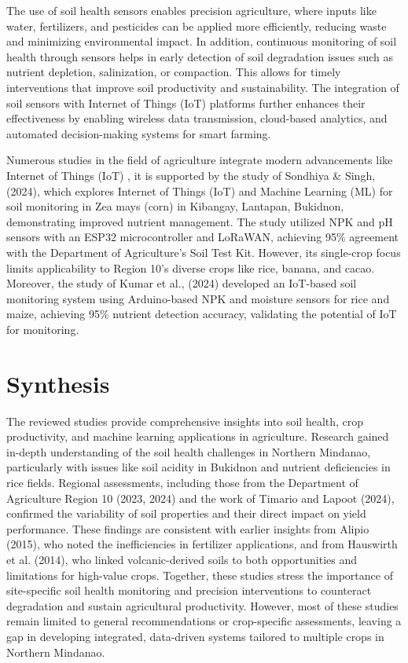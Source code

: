 {The use of soil health sensors enables precision agriculture, where inputs like water, fertilizers, and pesticides can be applied more efficiently, reducing waste and minimizing environmental impact. In addition, continuous monitoring of soil health through sensors helps in early detection of soil degradation issues such as nutrient depletion, salinization, or compaction. This allows for timely interventions that improve soil productivity and sustainability. The integration of soil sensors with Internet of Things (IoT) platforms further enhances their effectiveness by enabling wireless data transmission, cloud-based analytics, and automated decision-making systems for smart farming.

Numerous studies in the field of agriculture integrate modern advancements like Internet of Things (IoT) , it is supported by the study of Sondhiya \& Singh, (2024), which explores  Internet of Things (IoT) and Machine Learning (ML) for soil monitoring in Zea mays (corn) in Kibangay, Lantapan, Bukidnon, demonstrating improved nutrient management. The study utilized NPK and pH sensors with an ESP32 microcontroller and LoRaWAN, achieving 95\% agreement with the Department of Agriculture’s Soil Test Kit. However, its single-crop focus limits applicability to Region 10’s diverse crops like rice, banana, and cacao. Moreover, the study of Kumar et al., (2024) developed an IoT-based soil monitoring system using Arduino-based NPK and moisture sensors for rice and maize, achieving 95\% nutrient detection accuracy, validating the potential of IoT for  monitoring.

\section{Synthesis}
The reviewed studies provide comprehensive insights into soil health, crop productivity, and machine learning applications in agriculture. Research gained in-depth understanding of the soil health challenges in Northern Mindanao, particularly with issues like soil acidity in Bukidnon and nutrient deficiencies in rice fields. Regional assessments, including those from the Department of Agriculture Region 10 (2023, 2024) and the work of Timario and Lapoot (2024), confirmed the variability of soil properties and their direct impact on yield performance. These findings are consistent with earlier insights from Alipio (2015), who noted the inefficiencies in fertilizer applications, and from Hauswirth et al. (2014), who linked volcanic-derived soils to both opportunities and limitations for high-value crops. Together, these studies stress the importance of site-specific soil health monitoring and precision interventions to counteract degradation and sustain agricultural productivity. However, most of these studies remain limited to general recommendations or crop-specific assessments, leaving a gap in developing integrated, data-driven systems tailored to multiple crops in Northern Mindanao.

}
